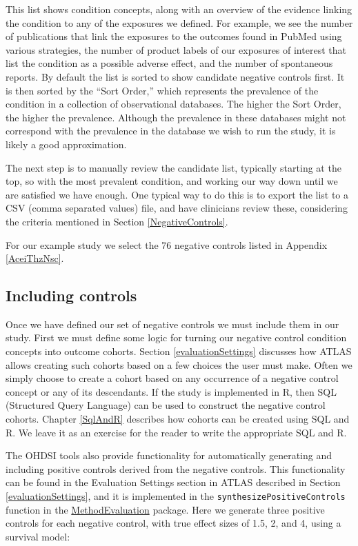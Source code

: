 \documentclass[11pt]{book}
\theoremstyle{definition}
\theoremstyle{definition}
\theoremstyle{definition}
\theoremstyle{remark}
\begin{document}
This list shows condition concepts, along with an overview of the evidence linking the condition to any of the exposures we defined. For example, we see the number of publications that link the exposures to the outcomes found in PubMed using various strategies, the number of product labels of our exposures of interest that list the condition as a possible adverse effect, and the number of spontaneous reports. By default the list is sorted to show candidate negative controls first. It is then sorted by the ``Sort Order,'' which represents the prevalence of the condition in a collection of observational databases. The higher the Sort Order, the higher the prevalence. Although the prevalence in these databases might not correspond with the prevalence in the database we wish to run the study, it is likely a good approximation.

The next step is to manually review the candidate list, typically starting at the top, so with the most prevalent condition, and working our way down until we are satisfied we have enough. One typical way to do this is to export the list to a CSV (comma separated values) file, and have clinicians review these, considering the criteria mentioned in Section \ref{NegativeControls}.

For our example study we select the 76 negative controls listed in Appendix \ref{AceiThzNsc}.

\hypertarget{including-controls}{%
\subsection{Including controls}\label{including-controls}}

Once we have defined our set of negative controls we must include them in our study. First we must define some logic for turning our negative control condition concepts into outcome cohorts. Section \ref{evaluationSettings} discusses how ATLAS allows creating such cohorts based on a few choices the user must make. Often we simply choose to create a cohort based on any occurrence of a negative control concept or any of its descendants. If the study is implemented in R, then SQL (Structured Query Language) can be used to construct the negative control cohorts. Chapter \ref{SqlAndR} describes how cohorts can be created using SQL and R. We leave it as an exercise for the reader to write the appropriate SQL and R.

The OHDSI tools also provide functionality for automatically generating and including positive controls derived from the negative controls. This functionality can be found in the Evaluation Settings section in ATLAS described in Section \ref{evaluationSettings}, and it is implemented in the \texttt{synthesizePositiveControls} function in the \href{https://ohdsi.github.io/MethodEvaluation/}{MethodEvaluation} package. Here we generate three positive controls for each negative control, with true effect sizes of 1.5, 2, and 4, using a survival model:
\end{document}

